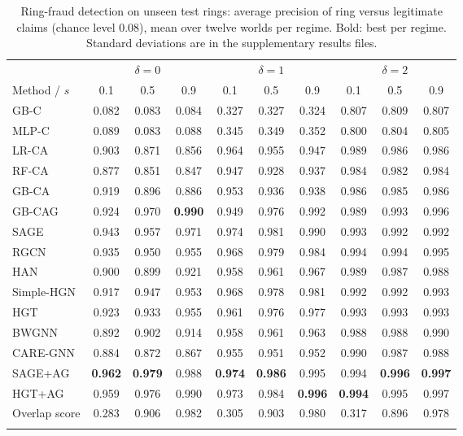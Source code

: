 \begin{table}[h]
\caption{Ring-fraud detection on unseen test rings: average precision of ring versus legitimate claims (chance level 0.08), mean over twelve worlds per regime. Bold: best per regime. Standard deviations are in the supplementary results files.}\label{tab:regime_ringap}
\scriptsize
\setlength{\tabcolsep}{4pt}
\begin{tabular}{@{}lccccccccc@{}}
\toprule
 & \multicolumn{3}{c}{$\delta=0$} & \multicolumn{3}{c}{$\delta=1$} & \multicolumn{3}{c}{$\delta=2$} \\
\cmidrule(lr){2-4}\cmidrule(lr){5-7}\cmidrule(lr){8-10}
Method / $s$ & 0.1 & 0.5 & 0.9 & 0.1 & 0.5 & 0.9 & 0.1 & 0.5 & 0.9 \\
\midrule
GB-C & 0.082 & 0.083 & 0.084 & 0.327 & 0.327 & 0.324 & 0.807 & 0.809 & 0.807 \\
MLP-C & 0.089 & 0.083 & 0.088 & 0.345 & 0.349 & 0.352 & 0.800 & 0.804 & 0.805 \\
LR-CA & 0.903 & 0.871 & 0.856 & 0.964 & 0.955 & 0.947 & 0.989 & 0.986 & 0.986 \\
RF-CA & 0.877 & 0.851 & 0.847 & 0.947 & 0.928 & 0.937 & 0.984 & 0.982 & 0.984 \\
GB-CA & 0.919 & 0.896 & 0.886 & 0.953 & 0.936 & 0.938 & 0.986 & 0.985 & 0.986 \\
GB-CAG & 0.924 & 0.970 & \textbf{0.990} & 0.949 & 0.976 & 0.992 & 0.989 & 0.993 & 0.996 \\
\midrule
SAGE & 0.943 & 0.957 & 0.971 & 0.974 & 0.981 & 0.990 & 0.993 & 0.992 & 0.992 \\
RGCN & 0.935 & 0.950 & 0.955 & 0.968 & 0.979 & 0.984 & 0.994 & 0.994 & 0.995 \\
HAN & 0.900 & 0.899 & 0.921 & 0.958 & 0.961 & 0.967 & 0.989 & 0.987 & 0.988 \\
Simple-HGN & 0.917 & 0.947 & 0.953 & 0.968 & 0.978 & 0.981 & 0.992 & 0.992 & 0.993 \\
HGT & 0.923 & 0.933 & 0.955 & 0.961 & 0.976 & 0.977 & 0.993 & 0.993 & 0.993 \\
\midrule
BWGNN & 0.892 & 0.902 & 0.914 & 0.958 & 0.961 & 0.963 & 0.988 & 0.988 & 0.990 \\
CARE-GNN & 0.884 & 0.872 & 0.867 & 0.955 & 0.951 & 0.952 & 0.990 & 0.987 & 0.988 \\
\midrule
SAGE+AG & \textbf{0.962} & \textbf{0.979} & 0.988 & \textbf{0.974} & \textbf{0.986} & 0.995 & 0.994 & \textbf{0.996} & \textbf{0.997} \\
HGT+AG & 0.959 & 0.976 & 0.990 & 0.973 & 0.984 & \textbf{0.996} & \textbf{0.994} & 0.995 & 0.997 \\
Overlap score & 0.283 & 0.906 & 0.982 & 0.305 & 0.903 & 0.980 & 0.317 & 0.896 & 0.978 \\
\botrule
\end{tabular}
\end{table}
